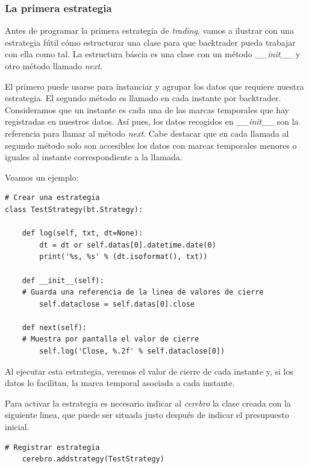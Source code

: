 \documentclass[12pt,a4paper]{article}
\begin{document}
		
		\subsubsection{La primera estrategia}
		
		Antes de programar la primera estrategia de \textit{trading}, vamos a ilustrar con una estrategia f\'util c\'omo estructurar una clase para que backtrader pueda trabajar con ella como tal. La estructura b\'ascia es una clase con un m\'etodo \textit{\_\_init\_\_} y otro m\'etodo llamado \textit{next}. 
		
		El primero puede usarse para instanciar y agrupar los datos que requiere nuestra estrategia. El segundo m\'etodo es llamado en cada instante por backtrader. Consideramos que un instante es cada una de las marcas temporales que hay registradas en nuestros datos. As\'i pues, los datos recogidos en \textit{\_\_init\_\_} son la referencia para llamar al m\'etodo \textit{next}.
		Cabe destacar que en cada llamada al segundo m\'etodo solo son accesibles los datos con marcas temporales menores o iguales al instante correspondiente a la llamada.
		
		Veamos un ejemplo:
		
		\begin{lstlisting}[basicstyle=\tiny]
# Crear una estrategia
class TestStrategy(bt.Strategy):

	def log(self, txt, dt=None):
		dt = dt or self.datas[0].datetime.date(0)
		print('%s, %s' % (dt.isoformat(), txt))
	
	def __init__(self):
	# Guarda una referencia de la linea de valores de cierre
		self.dataclose = self.datas[0].close
	
	def next(self):
	# Muestra por pantalla el valor de cierre
		self.log('Close, %.2f' % self.dataclose[0])
		\end{lstlisting}
		
		Al ejecutar esta estrategia, veremos el valor de cierre de cada instante y, si los datos lo facilitan, la marca temporal asociada a cada instante.
		
		Para activar la estrategia es necesario indicar al \textit{cerebro} la clase creada con la siguiente linea, que puede ser situada justo despu\'es de indicar el presupuesto inicial.

		\begin{lstlisting}[basicstyle=\tiny]
    # Registrar estrategia
    cerebro.addstrategy(TestStrategy)
		\end{lstlisting}	
		
\end{document}
